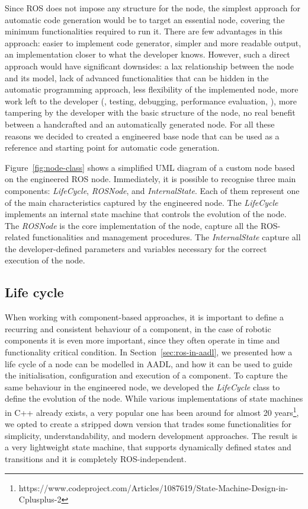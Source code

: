 Since ROS does not impose any structure for the node, the simplest approach for automatic code generation would be to target an essential node, covering the minimum functionalities required to run it. There are few advantages in this approach: easier to implement code generator, simpler and more readable output, an implementation closer to what the developer knows. However, such a direct approach would have significant downsides: a lax relationship between the node and its model, lack of advanced functionalities that can be hidden in the automatic programming approach, less flexibility of the implemented node, more work left to the developer (\eg, testing, debugging, performance evaluation, \etc), more tampering by the developer with the basic structure of the node, no real benefit between a handcrafted and an automatically generated node. For all these reasons we decided to created a engineered base node that can be used as a reference and starting point for automatic code generation.

Figure~\ref{fig:node-class} shows a simplified UML diagram of a custom node based on the engineered ROS node. Immediately, it is possible to recognise three main components: \textit{LifeCycle}, \textit{ROSNode}, and \textit{InternalState}. Each of them represent one of the main characteristics captured by the engineered node. The \textit{LifeCycle} implements an internal state machine that controls the evolution of the node. The \textit{ROSNode} is the core implementation of the node, capture all the ROS-related functionalities and management procedures. The \textit{InternalState} capture all the developer-defined parameters and variables necessary for the correct execution of the node.

\subsection{Life cycle}
When working with component-based approaches, it is important to define a recurring and consistent behaviour of a component, in the case of robotic components it is even more important, since they often operate in time and functionality critical condition. In Section~\ref{sec:ros-in-aadl}, we presented how a life cycle of a node can be modelled in AADL, and how it can be used to guide the initialisation, configuration and execution of a component. To capture the same behaviour in the engineered node, we developed the \textit{LifeCycle} class to define the evolution of the node. While various implementations of state machines in C++ already exists, a very popular one has been around for almost 20 years\footnote{https://www.codeproject.com/Articles/1087619/State-Machine-Design-in-Cplusplus-2}, we opted to create a stripped down version that trades some functionalities for simplicity, understandability, and modern development approaches. The result is a very lightweight state machine, that supports dynamically defined states and transitions and it is completely ROS-independent.

